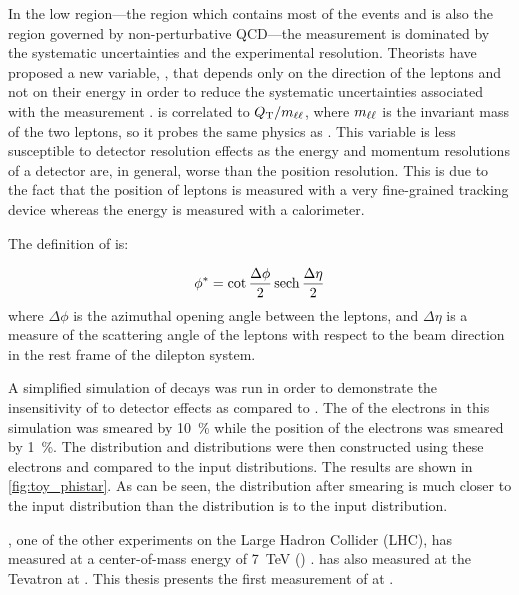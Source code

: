 In the low \bosonpt region---the region which contains most of the \Z events
and is also the region governed by non-perturbative QCD---the measurement is
dominated by the systematic uncertainties and the experimental resolution.
Theorists have proposed a new variable, \phistar, that depends only on the
direction of the leptons and not on their energy in order to reduce the
systematic uncertainties associated with the measurement \cite{banfi_2011}.
\phistar is correlated to $Q_{\mathrm{T}} / m_{\ell\ell}$, where $m_{\ell\ell}$ is the invariant mass
of the two leptons, so it probes the same physics as \bosonpt. This variable is
less susceptible to detector resolution effects as the energy and momentum
resolutions of a detector are, in general, worse than the position resolution.
This is due to the fact that the position of leptons is measured with a very
fine-grained tracking device whereas the energy is measured with a calorimeter.

The definition of \phistar is:

\begin{equation}\label{eq:phistar}
    \phi^{*} = \cot \frac{\Delta \phi}{2} \operatorname{sech} \frac{\Delta \eta}{2}
\end{equation}
%
where $\Delta \phi$ is the azimuthal opening angle between the leptons, and
$\Delta \eta$ is a measure of the scattering angle of the leptons with respect
to the beam direction in the rest frame of the dilepton system.

A simplified simulation of \Ztoee decays was run in order to demonstrate the
insensitivity of \phistar to detector effects as compared to \bosonpt. The \pt
of the electrons in this simulation was smeared by \SI{10}{\percent} while the
position of the electrons was smeared by \SI{1}{\percent}. The \phistar
distribution and \bosonpt distributions were then constructed using these
electrons and compared to the input distributions. The results are shown in
\cref{fig:toy_phistar}. As can be seen, the \phistar distribution after
smearing is much closer to the input \phistar distribution than the \bosonpt
distribution is to the input \bosonpt distribution.



\ATLAS, one of the other experiments on the Large Hadron Collider (LHC), has
measured \phistar at a center-of-mass energy of \SI{7}{\TeV} (\rootsseven)
\cite{atlas_phistar}. \DZERO has also measured \phistar at the Tevatron at
\rootsTevatron \cite{d0_phistar_2011,d0_phistar_2014}. This thesis presents the
first measurement of \phistar at \rootseight.
